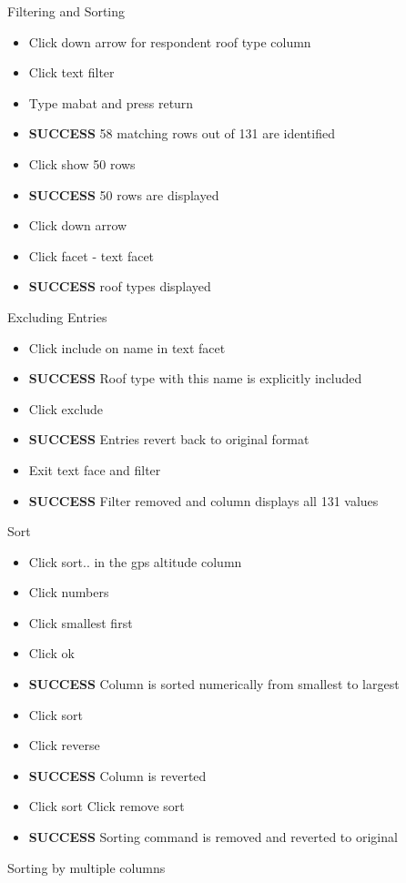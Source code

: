 \documentclass{article}
\begin{document}
Filtering and Sorting 
\begin{itemize}
\item Click down arrow for respondent roof type column
\item Click text filter
\item Type mabat and press return
\item \textbf{SUCCESS} 58 matching rows out of 131 are identified
\item Click show 50 rows
\item \textbf{SUCCESS} 50 rows are displayed
\item Click down arrow
\item Click facet - text facet
\item \textbf{SUCCESS} roof types displayed
\end{itemize}
Excluding Entries
\begin{itemize}
\item Click include on name in text facet
\item \textbf{SUCCESS} Roof type with this name is explicitly included 
\item Click exclude
\item \textbf{SUCCESS} Entries revert back to original format
\item Exit text face and filter
\item \textbf{SUCCESS} Filter removed and column displays all 131 values
\end{itemize}
Sort
\begin{itemize}
\item Click sort.. in the gps altitude column 
\item Click numbers
\item Click smallest first
\item Click ok
\item \textbf{SUCCESS} Column is sorted numerically from smallest to largest 
\item Click sort
\item Click reverse
\item \textbf{SUCCESS} Column is reverted
\item Click sort 
\itetm Click remove sort
\item \textbf{SUCCESS} Sorting command is removed and reverted to original
\end{itemize}
Sorting by multiple columns
\end{document}
